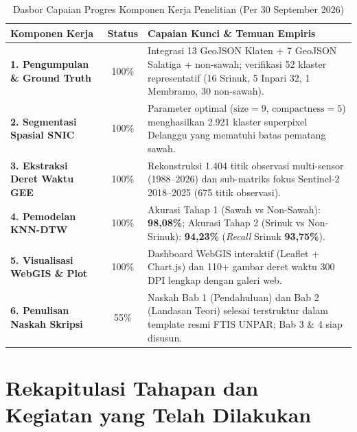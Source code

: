 \documentclass[11pt,a4paper]{article}
\begin{document}
\begin{table}[htbp]
    \centering\small
    \caption{Dasbor Capaian Progres Komponen Kerja Penelitian (Per 30 September 2026)}
    \begin{tabularx}{\textwidth}{>{\bfseries}l c X}
        \toprule
        \textbf{Komponen Kerja} & \textbf{Status} & \textbf{Capaian Kunci \& Temuan Empiris} \\
        \midrule
        1. Pengumpulan \& Ground Truth & 100\% & Integrasi 13 GeoJSON Klaten + 7 GeoJSON Salatiga + non-sawah; verifikasi 52 klaster representatif (16 Srinuk, 5 Inpari 32, 1 Membramo, 30 non-sawah). \\
        2. Segmentasi Spasial SNIC     & 100\% & Parameter optimal ($\text{size}=9$, $\text{compactness}=5$) menghasilkan 2.921 klaster superpixel Delanggu yang mematuhi batas pematang sawah. \\
        3. Ekstraksi Deret Waktu GEE   & 100\% & Rekonstruksi 1.404 titik observasi multi-sensor (1988--2026) dan sub-matriks fokus Sentinel-2 2018--2025 (675 titik observasi). \\
        4. Pemodelan KNN-DTW           & 100\% & Akurasi Tahap 1 (Sawah vs Non-Sawah): \textbf{98,08\%}; Akurasi Tahap 2 (Srinuk vs Non-Srinuk): \textbf{94,23\%} (\textit{Recall} Srinuk \textbf{93,75\%}). \\
        5. Visualisasi WebGIS \& Plot  & 100\% & Dashboard WebGIS interaktif (Leaflet + Chart.js) dan 110+ gambar deret waktu 300 DPI lengkap dengan galeri web. \\
        6. Penulisan Naskah Skripsi    & 55\%  & Naskah Bab 1 (Pendahuluan) dan Bab 2 (Landasan Teori) selesai terstruktur dalam template resmi FTIS UNPAR; Bab 3 \& 4 siap disusun. \\
        \bottomrule
    \end{tabularx}
\end{table}

\section{Rekapitulasi Tahapan dan Kegiatan yang Telah Dilakukan}
\end{document}
